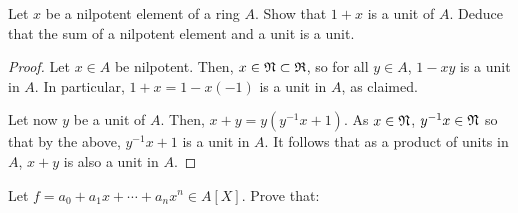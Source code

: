 \problem Let $x$ be a nilpotent element of a ring $A$. Show that $1 + x$ is a unit of $A$.
Deduce that the sum of a nilpotent element and a unit is a unit.

\begin{proof}
    Let $x \in A$ be nilpotent.
    Then, $x \in \mathfrak{N} \subset \mathfrak{R}$, so for all $y \in A$, $1- xy$ is a unit in $A$.
    In particular, $1 + x = 1 - x(-1)$ is a unit in $A$, as claimed.

    Let now $y$ be a unit of $A$.
    Then, $x + y = y(y^{-1}x + 1)$.
    As $x \in \mathfrak{N}$, $y^{-1}x \in \mathfrak{N}$ so that by the above, $y^{-1}x + 1$ is a unit in $A$.
    It follows that as a product of units in $A$, $x + y$ is also a unit in $A$.
\end{proof}

\problem Let $f = a_0 + a_1x + \cdots + a_nx^n \in A[X]$. Prove that:
